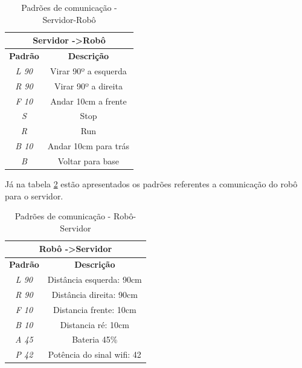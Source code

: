 		\begin{table}[H]
		\centering
		\caption{Padrões de comunicação - Servidor-Robô}
		\label{tab:protocolo_comunicacao1}
		\begin{tabular}{|c|c|}
		\hline
		\multicolumn{2}{|c|}{\textbf{Servidor -\textgreater Robô}} \\ \hline
		\textbf{Padrão}           & \textbf{Descrição}             \\ \hline
		\textit{L 90}             & Virar 90º a esquerda           \\ \hline
		\textit{R 90}                      & Virar 90º a direita            \\ \hline
		\textit{F 10}                      & Andar 10cm a frente            \\ \hline
		\textit{S}                         & Stop                           \\ \hline
		\textit{R}                & Run                            \\ \hline
		\textit{B 10}             & Andar 10cm para trás           \\ \hline
		\textit{B}                & Voltar para base               \\ \hline
		\end{tabular}
		\end{table}

		Já na tabela \ref{tab:protocolo_comunicacao2} estão apresentados os padrões referentes a comunicação do robô para o servidor.

		\begin{table}[H]
		\centering
		\caption{Padrões de comunicação - Robô-Servidor}
		\label{tab:protocolo_comunicacao2}
		\begin{tabular}{|c|c|}
		\hline
		\multicolumn{2}{|c|}{\textbf{Robô -\textgreater Servidor}} \\ \hline
		\textbf{Padrão}        & \textbf{Descrição}                \\ \hline
		\textit{L 90}          & Distância esquerda: 90cm          \\ \hline
		\textit{R 90}                   & Distância direita: 90cm           \\ \hline
		\textit{F 10}                   & Distancia frente: 10cm            \\ \hline
		\textit{B 10}                   & Distancia ré: 10cm            \\ \hline
		\textit{A 45}                   & Bateria 45\%                      \\ \hline
		\textit{P 42}          & Potência do sinal wifi: 42        \\ \hline
		\end{tabular}
		\end{table}

